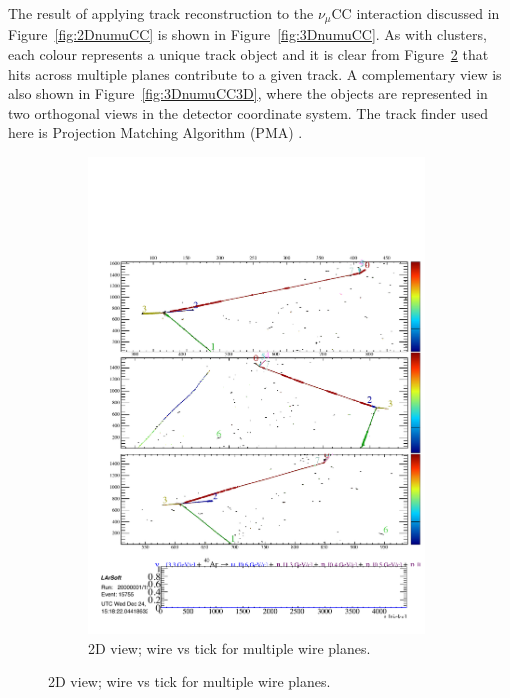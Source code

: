 The result of applying track reconstruction to the $\nu_{\mu}$CC interaction discussed in Figure~\ref{fig:2DnumuCC} is shown in Figure~\ref{fig:3DnumuCC}.  As with clusters, each colour represents a unique track object and it is clear from Figure~\ref{fig:3DnumuCC2D} that hits across multiple planes contribute to a given track.  A complementary view is also shown in Figure~\ref{fig:3DnumuCC3D}, where the objects are represented in two orthogonal views in the detector coordinate system.  The track finder used here is Projection Matching Algorithm (PMA) \cite{PMA2013}.

\begin{figure}
  \centering
  \begin{subfigure}[t]{0.48\linewidth}
    \centering
    \includegraphics[width=0.98\textwidth]{3DnumuCC2D.pdf}
    \caption{2D view; wire vs tick for multiple wire planes.}
    \label{fig:3DnumuCC2D}
  \end{subfigure}

\end{figure}
